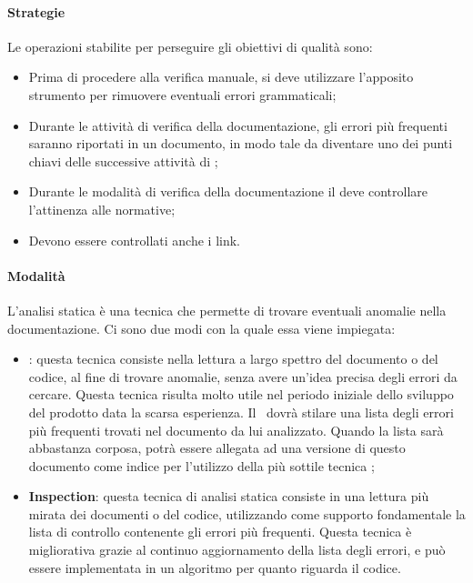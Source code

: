 \documentclass[../NormeDiProgetto_v4.0.0.tex]{subfiles}
\begin{document}
			\paragraph{Strategie}
				Le operazioni stabilite per perseguire gli obiettivi di qualità sono:
				\begin{itemize}
					\item Prima di procedere alla verifica manuale, si deve utilizzare l'apposito strumento per rimuovere eventuali errori grammaticali;
					\item Durante le attività di verifica della documentazione, gli errori più frequenti saranno riportati in un documento, in modo tale da diventare uno dei punti chiavi delle successive attività di ;
					\item Durante le modalità di verifica della documentazione il \verificatore deve controllare l'attinenza alle normative;
					\item Devono essere controllati anche i link.
				\end{itemize}

			\paragraph{Modalità}
				L'analisi statica è una tecnica che permette di trovare eventuali anomalie nella
				documentazione. Ci sono due modi con la quale essa viene
				impiegata:
				\begin{itemize}
				\item \textbf{}: questa tecnica consiste nella lettura a largo spettro del documento o del codice, al fine di trovare anomalie, senza avere un'idea precisa degli errori da cercare.
				Questa tecnica risulta molto utile nel periodo iniziale dello sviluppo del prodotto data la scarsa esperienza. Il \verificatore\ dovrà stilare una lista degli errori più frequenti trovati nel documento da lui analizzato. Quando la lista sarà abbastanza corposa, potrà essere allegata ad una versione di questo documento come indice per l'utilizzo della più sottile tecnica ;		
				\item \textbf{Inspection}: questa tecnica di analisi statica consiste in una lettura più mirata dei documenti o del codice, utilizzando come supporto fondamentale la lista di controllo contenente gli errori più frequenti. Questa tecnica è migliorativa grazie al continuo aggiornamento della lista degli errori, e può essere implementata in un algoritmo per quanto riguarda il codice.
				\end{itemize}
\end{document}
